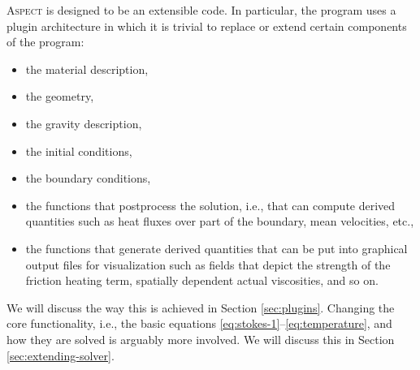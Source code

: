 \documentclass{article}
\newcommand{\aspect}{\textsc{Aspect}}
\begin{document}
\aspect{} is designed to be an extensible code. In particular, the program
uses a plugin architecture in which it is trivial to replace
or extend certain components of the program:
\begin{itemize}
\item the material description,
\item the geometry,
\item the gravity description,
\item the initial conditions,
\item the boundary conditions,
\item the functions that postprocess the solution, i.e., that can compute
  derived quantities such as heat fluxes over part of the boundary, mean
  velocities, etc.,
\item the functions that generate derived quantities that can be put into
  graphical output files for visualization such as fields that depict the
  strength of the friction heating term, spatially dependent actual
  viscosities, and so on.
\end{itemize}
We will discuss the way this is achieved in Section
\ref{sec:plugins}. Changing the core functionality, i.e., the basic equations
\eqref{eq:stokes-1}--\eqref{eq:temperature}, and how they are solved is
arguably more involved. We will discuss this in Section
\ref{sec:extending-solver}.
\end{document}
